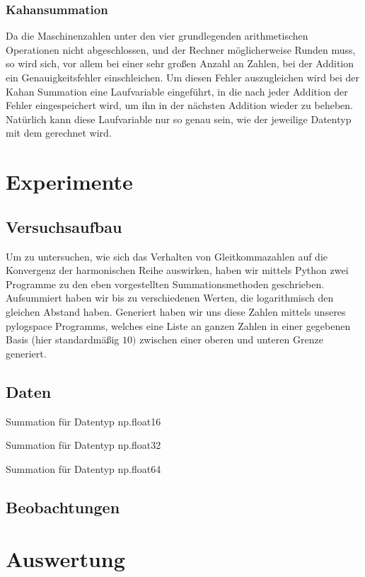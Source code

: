 \documentclass{scrartcl}
\begin{document}
\subsubsection{Kahansummation}
Da die Maschinenzahlen unter den vier grundlegenden arithmetischen Operationen
nicht abgeschlossen, und der Rechner möglicherweise Runden muss, so wird sich,
vor allem bei einer sehr großen Anzahl an Zahlen, bei der Addition ein
Genauigkeitsfehler einschleichen.
Um diesen Fehler auszugleichen wird bei der Kahan Summation eine Laufvariable
eingeführt, in die nach jeder Addition der Fehler eingespeichert wird, um ihn
in der nächsten Addition wieder zu beheben.
Natürlich kann diese Laufvariable nur so genau sein, wie der jeweilige Datentyp
mit dem gerechnet wird.

\section{Experimente}
\subsection{Versuchsaufbau}
Um zu untersuchen, wie sich das Verhalten von Gleitkommazahlen auf die
Konvergenz der harmonischen Reihe auswirken, haben wir mittels Python zwei
Programme zu den eben vorgestellten Summationsmethoden geschrieben.
Aufsummiert haben wir bis zu verschiedenen Werten, die logarithmisch den
gleichen Abstand haben.
Generiert haben wir uns diese Zahlen mittels unseres pylogspace Programms,
welches eine Liste an ganzen Zahlen in einer gegebenen Basis (hier
standardmäßig \(10)\) zwischen einer oberen und unteren Grenze generiert.

\subsection{Daten}

Summation für Datentyp np.float16

Summation für Datentyp
np.float32

Summation für Datentyp np.float64

\subsection{Beobachtungen}

\section{Auswertung}
\end{document}
